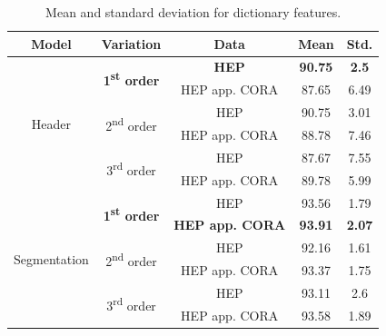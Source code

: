 \begin{table}[h]
\begin{center}
\begin{tabular}{|c|c|c|c|c|}
\hline
Model & Variation & Data & Mean & Std.\\
\hline
\multirow{6}{*}{Header} & \multirow{2}{*}{\textbf{1\textsuperscript{st} order}} & \textbf{HEP} & \textbf{90.75} & \textbf{2.5}\\\cline{3-5}
& & HEP app. CORA & 87.65 & 6.49\\\cline{2-5}
& \multirow{2}{*}{2\textsuperscript{nd} order} & HEP & 90.75 & 3.01\\\cline{3-5}
& & HEP app. CORA & 88.78 & 7.46\\\cline{2-5}
& \multirow{2}{*}{3\textsuperscript{rd} order} & HEP & 87.67 & 7.55\\\cline{3-5}
& & HEP app. CORA & 89.78 & 5.99\\ \hline
\multirow{6}{*}{Segmentation} & \multirow{2}{*}{\textbf{1\textsuperscript{st} order}} & HEP & 93.56 & 1.79\\\cline{3-5}
& & \textbf{HEP app. CORA} & \textbf{93.91} & \textbf{2.07}\\\cline{2-5}
& \multirow{2}{*}{2\textsuperscript{nd} order} & HEP & 92.16 & 1.61\\\cline{3-5}
& & HEP app. CORA & 93.37 & 1.75\\\cline{2-5}
& \multirow{2}{*}{3\textsuperscript{rd} order} & HEP & 93.11 & 2.6\\\cline{3-5}
& & HEP app. CORA & 93.58 & 1.89\\
\hline
\end{tabular}
\caption{Mean and standard deviation for dictionary features.}
\label{table:dictionaryresults}
\end{center}
\end{table}

